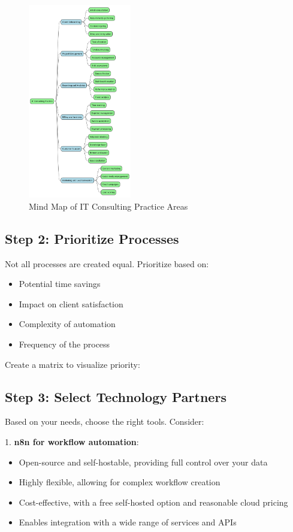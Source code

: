\begin{figure}[h]
    \centering
    \includegraphics[width=0.40\textwidth]{./figures/04-consulting_practice_mindmap}
    \caption{Mind Map of IT Consulting Practice Areas}
    \label{fig:consulting_mindmap}
\end{figure}

\subsection{Step 2: Prioritize Processes}

Not all processes are created equal. Prioritize based on:
\begin{itemize}
    \item Potential time savings
    \item Impact on client satisfaction
    \item Complexity of automation
    \item Frequency of the process
\end{itemize}

Create a matrix to visualize priority:


\subsection{Step 3: Select Technology Partners}

Based on your needs, choose the right tools. Consider:

1. \textbf{n8n for workflow automation}:
\begin{itemize}
    \item Open-source and self-hostable, providing full control over your data
    \item Highly flexible, allowing for complex workflow creation
    \item Cost-effective, with a free self-hosted option and reasonable cloud pricing
    \item Enables integration with a wide range of services and APIs
\end{itemize}

